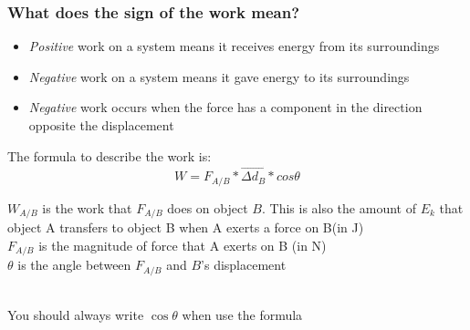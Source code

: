 \subsubsection{What does the sign of the work mean?}
\begin{itemize}
    \item \textit{Positive} work on a system means it receives energy from its surroundings
    \item \textit{Negative} work on a system means it gave energy to its surroundings 
    \item \textit{Negative} work occurs when the force has a component in the direction opposite the displacement
\end{itemize}
The formula to describe the work is:
\begin{equation}
    W = F_{A/B} * \vec{\Delta d_B} * cos\theta
\end{equation}
\begin{center}
    $W_{A/B}$ is the work that $F_{A/B}$ does on object $B$. This is also the amount of $E_k$ that object A transfers to object B 
    when A exerts a force on B(in J)\\

    $F_{A/B}$ is the magnitude of force that A exerts on B (in N)\\

    $\theta$ is the angle between $F_{A/B}$ and $B$'s displacement
\end{center}

\begin{remark}
    \\
    
    You should always write $\cos \theta$ when use the formula
\end{remark}
